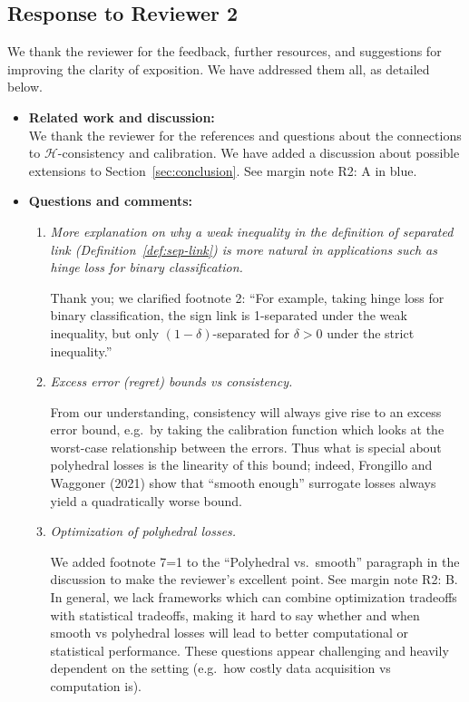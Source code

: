 \documentclass[a4paper]{article}
\newcommand{\Comments}{1}
\newcommand{\mytodo}[2]{\ifnum\Comments=1\todo[linecolor=#1!80!black,backgroundcolor=#1,bordercolor=#1!80!black]{#2}\fi}
\newcommand{\jessiet}[1]{\mytodo{blue!20!white}{JF: #1}}
\begin{document}
\subsection*{Response to Reviewer 2}

We thank the reviewer for the feedback, further resources, and suggestions for improving the clarity of exposition.
We have addressed them all, as detailed below.

\begin{itemize}
\item \textbf{Related work and discussion:}\\
 We thank the reviewer for the references and questions about the connections to $\mathcal{H}$-consistency and calibration. We have added a discussion about possible extensions to Section~\ref{sec:conclusion}. See margin note R2: A in blue.
  
\item \textbf{Questions and comments:}
  \begin{enumerate}
  \item \emph{More explanation on why a weak inequality in the definition of separated link (Definition~\ref{def:sep-link}) is more natural in applications such as hinge loss for binary classification.}

    Thank you; we clarified footnote 2: ``For example, taking hinge loss for binary classification, the sign link is 1-separated under the weak inequality, but only $(1-\delta)$-separated for $\delta > 0$ under the strict inequality.''
    
  \item \emph{Excess error (regret) bounds vs consistency.}

    From our understanding, consistency will always give rise to an excess error bound, e.g.\ by taking the calibration function which looks at the worst-case relationship between the errors.
    Thus what is special about polyhedral losses is the linearity of this bound; indeed, Frongillo and Waggoner (2021) show that ``smooth enough'' surrogate losses always yield a quadratically worse bound.
    
  \item \emph{Optimization of polyhedral losses.}

    We added footnote 7\jessiet{double check footnote number} to the ``Polyhedral vs.\ smooth'' paragraph in the discussion to make the reviewer's excellent point. 
    See margin note R2: B.
    In general, we lack frameworks which can combine optimization tradeoffs with statistical tradeoffs, making it hard to say whether and when smooth vs polyhedral losses will lead to better computational or statistical performance.
    These questions appear challenging and heavily dependent on the setting (e.g.\ how costly data acquisition vs computation is).
    

\end{enumerate}
\end{itemize}
\end{document}
